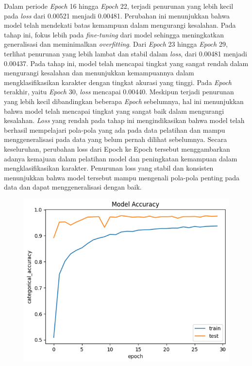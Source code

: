 Dalam periode \textit{Epoch} 16 hingga \textit{Epoch} 22, terjadi penurunan yang lebih kecil pada \textit{loss} dari 0.00521 menjadi 0.00481. Perubahan ini menunjukkan bahwa model telah mendekati batas kemampuan dalam mengurangi kesalahan. Pada tahap ini, fokus lebih pada \textit{fine-tuning} dari model sehingga meningkatkan generalisasi dan meminimalkan \textit{overfitting}. Dari \textit{Epoch} 23 hingga \textit{Epoch} 29, terlihat penurunan yang lebih lambat dan stabil dalam \textit{loss}, dari 0.00481 menjadi 0.00437. Pada tahap ini, model telah mencapai tingkat yang sangat rendah dalam mengurangi kesalahan dan menunjukkan kemampuannya dalam mengklasifikasikan karakter dengan tingkat akurasi yang tinggi. Pada \textit{Epoch} terakhir, yaitu \textit{Epoch} 30, \textit{loss} mencapai 0.00440. Meskipun terjadi penurunan yang lebih kecil dibandingkan beberapa \textit{Epoch} sebelumnya, hal ini menunjukkan bahwa model telah mencapai tingkat yang sangat baik dalam mengurangi kesalahan. \textit{Loss} yang rendah pada tahap ini mengindikasikan bahwa model telah berhasil mempelajari pola-pola yang ada pada data pelatihan dan mampu menggeneralisasi pada data yang belum pernah dilihat sebelumnya. Secara keseluruhan, perubahan loss dari Epoch ke Epoch tersebut menggambarkan adanya kemajuan dalam pelatihan model dan peningkatan kemampuan dalam mengklasifikasikan karakter. Penurunan loss yang stabil dan konsisten menunjukkan bahwa model tersebut mampu mengenali pola-pola penting pada data dan dapat menggeneralisasi dengan baik.


\begin{figure}[!hbt]
	\centering
	\includegraphics[width=0.7\linewidth]{gambar/bener/Accuracy_ModelCNN.png}
	\label{fig:AkurasiCNN1}
\end{figure}


